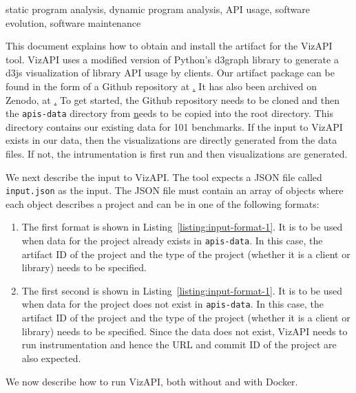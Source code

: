\documentclass[conference]{IEEEtran}
\begin{document}
\begin{IEEEkeywords}
static program analysis,
dynamic program analysis,
API usage,
software evolution,
software maintenance
\end{IEEEkeywords}


This document explains how to obtain and install the artifact for the VizAPI tool. VizAPI uses a modified version of Python's d3graph library to generate a d3js visualization of library API usage by clients. Our artifact package can be found in the form of a Github repository at \href{https://github.com/SruthiVenkat/api-visualization-tool}. It has also been archived on Zenodo, at \href{https://zenodo.org/record/7023911}. To get started, the Github repository needs to be cloned and then the \texttt{apis-data} directory from \href{https://doi.org/10.5281/zenodo.7023872} needs to be copied into the root directory. This directory contains our existing data for 101 benchmarks. If the input to VizAPI exists in our data, then the visualizations are directly generated from the data files. If not, the intrumentation is first run and then visualizations are generated.

We next describe the input to VizAPI. The tool expects a JSON file called \texttt{input.json} as the input. The JSON file must contain an array of objects where each object describes a project and can be in one of the following formats:

\begin{enumerate}
\item The first format is shown in Listing~\ref{listing:input-format-1}. It is to be used when data for the project already exists in \texttt{apis-data}. In this case, the artifact ID of the project and the type of the project (whether it is a client or library) needs to be specified.

\item The first second is shown in Listing~\ref{listing:input-format-1}. It is to be used when data for the project does not exist in \texttt{apis-data}. In this case, the artifact ID of the project and the type of the project (whether it is a client or library) needs to be specified. Since the data does not exist, VizAPI needs to run instrumentation and hence the URL and commit ID of the project are also expected.

\end{enumerate}

We now describe how to run VizAPI, both without and with Docker.
\end{document}
